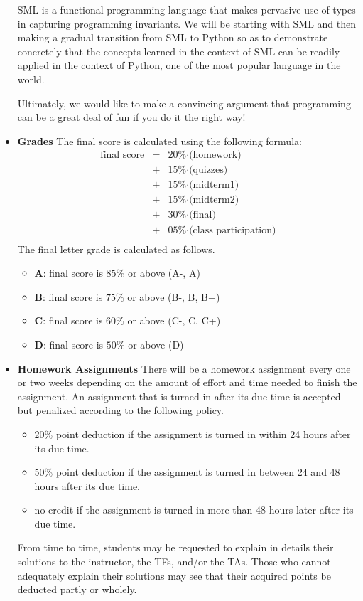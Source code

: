 \documentclass[11pt]{article}
\begin{document}
\begin{itemize}
SML is a functional programming language that makes pervasive use of
types in capturing programming invariants. We will be starting with
SML and then making a gradual transition from SML to Python so as to
demonstrate concretely that the concepts learned in the context of SML
can be readily applied in the context of Python, one of the most
popular language in the world.

Ultimately, we would like to make a convincing argument that programming
can be a great deal of fun if you do it the right way!

\item {\bf Grades}
The final score is calculated using the following formula:
\[\begin{array}{rcl}
\mbox{final score} & = & \mbox{20\%$\cdot$(homework)} \\
                   & + & \mbox{15\%$\cdot$(quizzes)} \\
                   & + & \mbox{15\%$\cdot$(midterm1)} \\
                   & + & \mbox{15\%$\cdot$(midterm2)} \\
                   & + & \mbox{30\%$\cdot$(final)} \\
                   & + & \mbox{05\%$\cdot$(class participation)} \\
\end{array}\]
The final letter grade is calculated as follows.
\begin{itemize}
\item{\bf A}: final score is $85\%$ or above (A-, A)
\item{\bf B}: final score is $75\%$ or above (B-, B, B+)
\item{\bf C}: final score is $60\%$ or above (C-, C, C+)
\item{\bf D}: final score is $50\%$ or above (D)
\end{itemize}

\item{\bf Homework Assignments}
There will be a homework assignment every one or two weeks depending on the
amount of effort and time needed to finish the assignment. An assignment that
is turned in after its due time is accepted but penalized according to the
following policy.
\begin{itemize}
\item 20\% point deduction if the assignment is turned in within 24 hours
after its due time.
\item 50\% point deduction if the assignment is turned in between 24 and 48 hours
after its due time.
\item no credit if the assignment is turned in more than 48 hours later after its due time.
\end{itemize}
From time to time, students may be requested to explain in details
their solutions to the instructor, the TFs, and/or the TAs. Those who
cannot adequately explain their solutions may see that their acquired
points be deducted partly or wholely.


\end{itemize}
\end{document}
